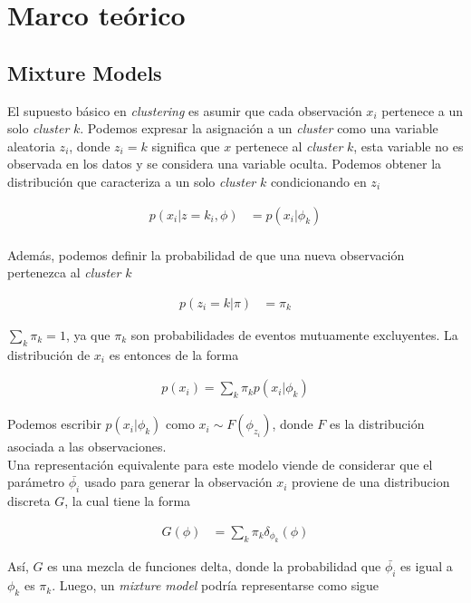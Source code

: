 \documentclass[letterpaper,12pt,oneside]{book} %
\begin{document}
\chapter{Marco teórico}
\section{Mixture Models}
\label{sec:mixture_model}

El supuesto básico en \textit{clustering} es asumir que cada observación $x_{i}$ pertenece a un solo \textit{cluster} $k$. Podemos expresar la asignación a un \textit{cluster} como una variable aleatoria $z_{i}$, donde $z_{i}=k$ significa que $x$ pertenece al \textit{cluster} $k$, esta variable no es observada en los datos y se considera una variable oculta. Podemos obtener la distribución que caracteriza a un solo \textit{cluster} $k$ condicionando en $z_{i}$

\begin{align}
    p(x_{i}|z=k_{i}, \phi) & = p(x_{i}|\phi_{k})\\
\end{align}

Además, podemos definir la probabilidad de que una nueva observación pertenezca al \textit{cluster} $k$ 

\begin{align}
    p(z_{i}=k|\pi) & = \pi_{k}
\end{align}

$\sum_{k}\pi_{k} = 1$, ya que $\pi_{k}$ son probabilidades de eventos mutuamente excluyentes. La distribución de $x_{i}$ es entonces de la forma

\begin{align}
    p(x_{i}) = \sum_{k}\pi_{k}p(x_{i}|\phi_{k})
\end{align}

Podemos escribir $p(x_{i}|\phi_{k})$ como $x_{i} \sim F(\phi_{z_{i}})$, donde $F$ es la distribución asociada a las observaciones. \\

Una representación equivalente para este modelo viende de considerar que el parámetro $\bar{\phi_{i}}$ usado para generar la observación $x_{i}$ proviene de una distribucion discreta $G$, la cual tiene la forma

\begin{align}
    G(\phi) & = \sum_{k} \pi_{k}\delta_{\phi_{k}}(\phi)
\end{align}

Así, $G$ es una mezcla de funciones delta, donde la probabilidad que $\bar{\phi_{i}}$ es igual a $\phi_{k}$ es $\pi_{k}$. Luego, un \textit{mixture model} podría representarse como sigue
\end{document}
